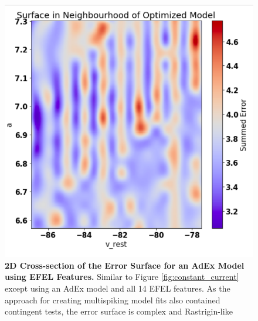 \begin{figure}
    \centering
    \includegraphics[scale=0.75]{figures/corrogations.png}
        \caption[A Complicated Error Surface]{\textbf{2D Cross-section of the Error Surface for an AdEx Model using EFEL Features.}
    Similar to Figure \ref{fig:constant_current} except using an AdEx model and all 14 EFEL features.
    As the approach for creating multispiking model fits also contained contingent tests, the error surface is complex and Rastrigin-like}
    \label{fig:real_problem_nontrivial_surface-1}
\end{figure}



